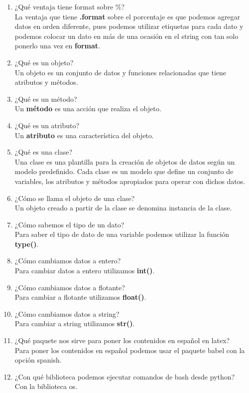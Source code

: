 \documentclass[letterpaper, 12pt, oneside]{article}%
\begin{document}
\begin{enumerate}
		\item ¿Qué ventaja tiene format sobre \%? \\ La ventaja que tiene \textbf{.format} sobre el porcentaje es que podemos agregar datos en orden diferente, pues podemos utilizar etiquetas para cada dato y podemos colocar un dato en más de una ocasión en el string con tan solo ponerlo una vez en \textbf{format}.
		\item ¿Qué es un objeto? \\ Un objeto es un conjunto de datos y funciones relacionadas que tiene atributos y métodos.
		\item ¿Qué es un método? \\ Un \textbf{método} es una acción que realiza el objeto.
		\item ¿Qué es un atributo? \\ Un \textbf{atributo} es una característica del objeto.
		\item ¿Qué es una clase? \\ Una clase es una plantilla para la creación de objetos de datos según un modelo predefinido. Cada clase es un modelo que define un conjunto de variables, los atributos y métodos apropiados para operar con dichos datos.
		\item ¿Cómo se llama el objeto de una clase? \\ Un objeto creado a partir de la clase se denomina instancia de la clase.
		\item ¿Cómo sabemos el tipo de un dato? \\ Para saber el tipo de dato de una variable podemos utilizar la función \textbf{type()}.
		\item  ¿Cómo cambiamos datos a entero? \\ Para cambiar datos a entero utilizamos \textbf{int()}.
		\item ¿Cómo cambiamos datos a flotante? \\ Para cambiar a flotante utilizamos \textbf{float()}.
		\item ¿Cómo cambiamos datos a string? \\ Para cambiar a string utilizamos \textbf{str()}.
		\item ¿Qué paquete nos sirve para poner los contenidos en español en latex? \\ Para poner los contenidos en español podemos usar el paquete babel con la opción spanish.
		\item ¿Con qué biblioteca podemos ejecutar comandos de bash desde python? \\ Con la biblioteca os.

\end{enumerate}
\end{document}
